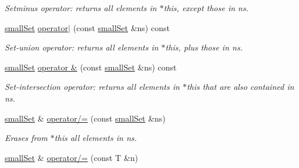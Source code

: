 \begin{CompactItemize}
\begin{CompactList}\small\item\em Setminus operator: returns all elements in $\ast$this, except those in ns. \item\end{CompactList}\item 
\hypertarget{classdai_1_1smallSet_00de21ede4f1c3d4ba8c3628d67e6446}{
\hyperlink{classdai_1_1smallSet}{smallSet} \hyperlink{classdai_1_1smallSet_00de21ede4f1c3d4ba8c3628d67e6446}{operator$|$} (const \hyperlink{classdai_1_1smallSet}{smallSet} \&ns) const }
\label{classdai_1_1smallSet_00de21ede4f1c3d4ba8c3628d67e6446}

\begin{CompactList}\small\item\em Set-union operator: returns all elements in $\ast$this, plus those in ns. \item\end{CompactList}\item 
\hypertarget{classdai_1_1smallSet_6f436313486360d66a5b9e2ea1a861bd}{
\hyperlink{classdai_1_1smallSet}{smallSet} \hyperlink{classdai_1_1smallSet_6f436313486360d66a5b9e2ea1a861bd}{operator \&} (const \hyperlink{classdai_1_1smallSet}{smallSet} \&ns) const }
\label{classdai_1_1smallSet_6f436313486360d66a5b9e2ea1a861bd}

\begin{CompactList}\small\item\em Set-intersection operator: returns all elements in $\ast$this that are also contained in ns. \item\end{CompactList}\item 
\hypertarget{classdai_1_1smallSet_5a53d38881904f6c7f2e2bbc4489790c}{
\hyperlink{classdai_1_1smallSet}{smallSet} \& \hyperlink{classdai_1_1smallSet_5a53d38881904f6c7f2e2bbc4489790c}{operator/=} (const \hyperlink{classdai_1_1smallSet}{smallSet} \&ns)}
\label{classdai_1_1smallSet_5a53d38881904f6c7f2e2bbc4489790c}

\begin{CompactList}\small\item\em Erases from $\ast$this all elements in ns. \item\end{CompactList}\item 
\hypertarget{classdai_1_1smallSet_8d3db122106f3ea6be80ceafd41316bb}{
\hyperlink{classdai_1_1smallSet}{smallSet} \& \hyperlink{classdai_1_1smallSet_8d3db122106f3ea6be80ceafd41316bb}{operator/=} (const T \&n)}
\label{classdai_1_1smallSet_8d3db122106f3ea6be80ceafd41316bb}


\end{CompactItemize}
